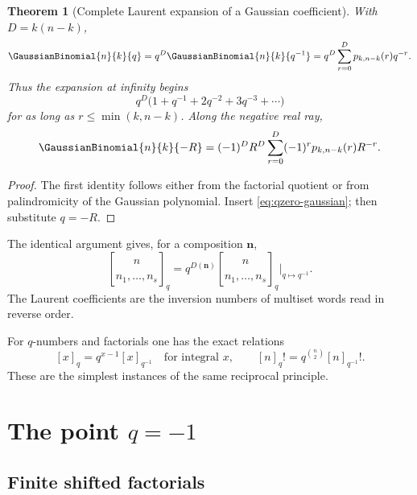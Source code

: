 \documentclass[11pt,oneside]{article}
\newtheorem{theorem}{Theorem}[section]
\theoremstyle{definition}
\theoremstyle{remark}
\newcommand{\qmultinom}[2]{\genfrac{[}{]}{0pt}{}{#1}{#2}_{q}}
\let\reporttopsection\section
\let\reportsubsection\subsection
\let\chapter\reporttopsection
\let\section\reportsubsection
\begin{document}
\begin{theorem}[Complete Laurent expansion of a Gaussian coefficient]
\label{thm:gaussian-infinity}
With $D=k(n-k)$,
\begin{equation}\label{eq:gaussian-reciprocity}
 \GaussianBinomial{n}{k}{q}=q^D\GaussianBinomial{n}{k}{q^{-1}}
 =q^D\sum_{r=0}^{D}p_{k,n-k}(r)q^{-r}.
\end{equation}
Thus the expansion at infinity begins
\[
 q^D\bigl(1+q^{-1}+2q^{-2}+3q^{-3}+\cdots\bigr)
\]
for as long as $r\le\min(k,n-k)$.  Along the negative real ray,
\begin{equation}\label{eq:gaussian-minus-infinity}
 \GaussianBinomial{n}{k}{-R}
 =(-1)^D R^D\sum_{r=0}^{D}(-1)^r p_{k,n-k}(r)R^{-r}.
\end{equation}
\end{theorem}

\begin{proof}
The first identity follows either from the factorial quotient or from
palindromicity of the Gaussian polynomial.  Insert
\eqref{eq:qzero-gaussian}; then substitute $q=-R$.
\end{proof}

The identical argument gives, for a composition $\bm n$,
\[
 \qmultinom{n}{n_1,\ldots,n_s}
 =q^{D(\bm n)}
 \qmultinom{n}{n_1,\ldots,n_s}\bigg|_{q\mapsto q^{-1}}.
\]
The Laurent coefficients are the inversion numbers of multiset words read in
reverse order.

For $q$-numbers and factorials one has the exact relations
\[
 [x]_q=q^{x-1}[x]_{q^{-1}}
 \quad\text{for integral }x,
 \qquad
 [n]_q!=q^{\binom n2}[n]_{q^{-1}}!.
\]
These are the simplest instances of the same reciprocal principle.

\chapter{The point \texorpdfstring{$q=-1$}{q = -1}}\label{chap:qminusone}

\section{Finite shifted factorials}
\end{document}
